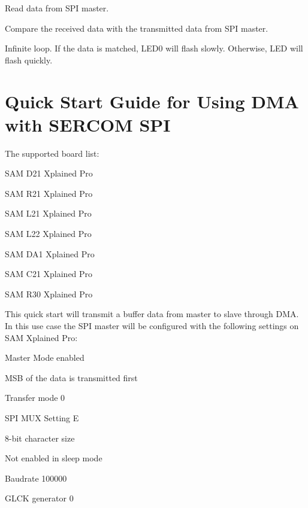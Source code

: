 \begin{DoxyEnumerate}
\item Read data from S\+PI master. 
\begin{DoxyCodeInclude}{0}
\end{DoxyCodeInclude}

\item Compare the received data with the transmitted data from S\+PI master. 
\begin{DoxyCodeInclude}{0}
\end{DoxyCodeInclude}

\item Infinite loop. If the data is matched, L\+E\+D0 will flash slowly. Otherwise, L\+ED will flash quickly. 
\begin{DoxyCodeInclude}{0}
\end{DoxyCodeInclude}

\end{DoxyEnumerate}\hypertarget{asfdoc_sam0_sercom_spi_dma_use_case}{}\section{Quick Start Guide for Using D\+MA with S\+E\+R\+C\+OM S\+PI}\label{asfdoc_sam0_sercom_spi_dma_use_case}
The supported board list\+:
\begin{DoxyItemize}
\item S\+AM D21 Xplained Pro
\item S\+AM R21 Xplained Pro
\item S\+AM L21 Xplained Pro
\item S\+AM L22 Xplained Pro
\item S\+AM D\+A1 Xplained Pro
\item S\+AM C21 Xplained Pro
\item S\+AM R30 Xplained Pro
\end{DoxyItemize}

This quick start will transmit a buffer data from master to slave through D\+MA. In this use case the S\+PI master will be configured with the following settings on S\+AM Xplained Pro\+:
\begin{DoxyItemize}
\item Master Mode enabled
\item M\+SB of the data is transmitted first
\item Transfer mode 0
\item S\+PI M\+UX Setting E
\item 8-\/bit character size
\item Not enabled in sleep mode
\item Baudrate 100000
\item G\+L\+CK generator 0
\end{DoxyItemize}


